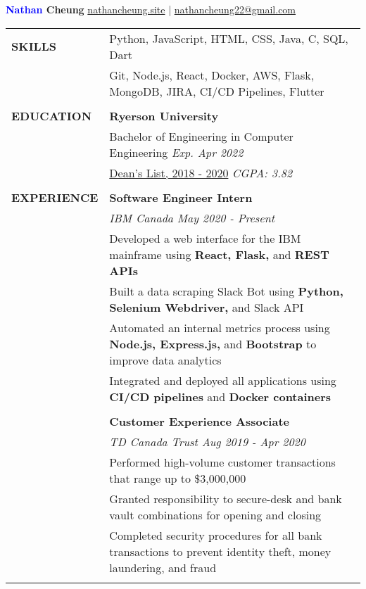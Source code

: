 \documentclass[letterpaper,11pt,oneside]{article}
\makeatletter
\newcommand\tabitem{\makebox[1em][r]{-~~}} %
\newcommand\tabspace{\makebox[1em][r]{~~~}} %
\newcommand{\header}{\noindent \huge{\textbf{\textcolor{blue}{Nathan} Cheung}} \hfill \normalsize{\href{https://nathancheung.site}{nathancheung.site} | \href{mailto:nathancheung22@gmail.com}{nathancheung22@gmail.com}} \\
\vspace{-2ex}
\hline 
\normalsize
\vspace{1.25em}}
\makeatother
\begin{document}
\header %


\noindent \begin{tabular}{@{}p{1.15in} p{6.08in}@{}}
 \textbf{SKILLS} 
     & Python, JavaScript, HTML, CSS, Java, C, SQL, Dart \\
     & Git, Node.js, React, Docker, AWS, Flask, MongoDB, JIRA, CI/CD Pipelines, Flutter \\
     & \\

 \textbf{EDUCATION}
     & \textbf{Ryerson University} \\
     & Bachelor of Engineering in Computer Engineering \hfill \textit{Exp. Apr 2022} \\
     & \href{https://www.ryerson.ca/content/dam/engineering-architectural-science/students/current-undergraduate/honours-recognition/pdfs/DeansList20182019September30.pdf}{Dean's List, 2018 - 2020} \hfill \textit{CGPA: 3.82} \\
     & \\

 \textbf{EXPERIENCE} 
     & \textbf{Software Engineer Intern} \\
     & \textit{IBM Canada \hfill May 2020 - Present} \\
     & \tabitem Developed a web interface for the IBM mainframe using \textbf{React, Flask,} and \textbf{REST APIs} \\
     & \tabitem Built a data scraping Slack Bot using \textbf{Python, Selenium Webdriver,} and Slack API \\
     & \tabitem Automated an internal metrics process using \textbf{Node.js, Express.js,} and \textbf{Bootstrap} to \tabspace improve data analytics \\
     & \tabitem Integrated and deployed all applications using \textbf{CI/CD pipelines} and \textbf{Docker containers} \\
     & \\
 
     & \textbf{Customer Experience Associate} \\
     & \textit{TD Canada Trust \hfill Aug 2019 - Apr 2020} \\
     & \tabitem Performed high-volume customer transactions that range up to \$3,000,000 \\ 
     & \tabitem Granted responsibility to secure-desk and bank vault combinations for opening and closing \\
     & \tabitem Completed security procedures for all bank transactions to prevent identity theft, money \tabspace laundering, and fraud \\
     & \\
     

\end{tabular}
\end{document}
